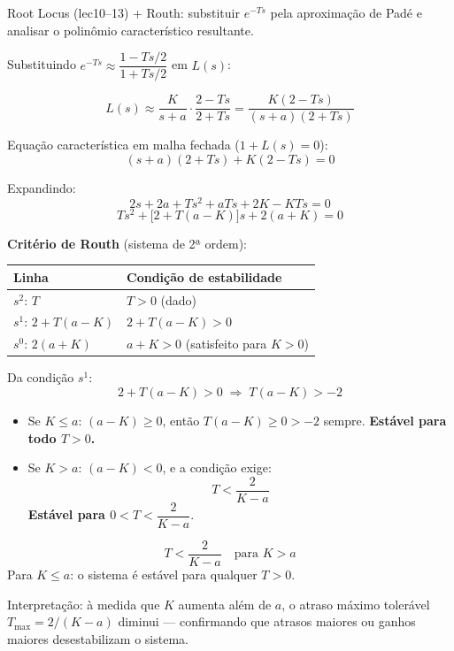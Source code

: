 \documentclass[12pt,a4paper]{article}
\begin{document}
\begin{metodo}
  Root Locus (lec10--13) + Routh: substituir $e^{-Ts}$ pela aproximação de
  Padé e analisar o polinômio característico resultante.
\end{metodo}

Substituindo $e^{-Ts} \approx \dfrac{1 - Ts/2}{1 + Ts/2}$ em $L(s)$:

\[
  L(s) \approx \frac{K}{s + a} \cdot \frac{2 - Ts}{2 + Ts}
  = \frac{K(2 - Ts)}{(s + a)(2 + Ts)}
\]

Equação característica em malha fechada ($1 + L(s) = 0$):
\[
  (s + a)(2 + Ts) + K(2 - Ts) = 0
\]

Expandindo:
\[
  2s + 2a + Ts^2 + aTs + 2K - KTs = 0
\]
\[
  Ts^2 + \bigl[2 + T(a - K)\bigr]s + 2(a + K) = 0
\]

\textbf{Critério de Routh} (sistema de 2ª ordem):
\begin{center}
\begin{tabular}{ll}
\toprule
Linha & Condição de estabilidade \\
\midrule
$s^2$: $T$ & $T > 0$ \hfill (dado) \\
$s^1$: $2 + T(a - K)$ & $2 + T(a - K) > 0$ \\
$s^0$: $2(a + K)$ & $a + K > 0$ \hfill (satisfeito para $K > 0$) \\
\bottomrule
\end{tabular}
\end{center}

Da condição $s^1$:
\[
  2 + T(a - K) > 0
  \;\Rightarrow\;
  T(a - K) > -2
\]

\begin{itemize}
  \item Se $K \leq a$: $(a - K) \geq 0$, então $T(a-K) \geq 0 > -2$ sempre.
        \textbf{Estável para todo $T > 0$.}
  \item Se $K > a$: $(a - K) < 0$, e a condição exige:
        \[
          T < \frac{2}{K - a}
        \]
        \textbf{Estável para $0 < T < \dfrac{2}{K - a}$}.
\end{itemize}

\begin{resposta}
\[
  \boxed{T < \frac{2}{K - a} \quad \text{para } K > a}
\]
Para $K \leq a$: o sistema é estável para qualquer $T > 0$.

Interpretação: à medida que $K$ aumenta além de $a$, o atraso máximo
tolerável $T_{\max} = 2/(K-a)$ diminui — confirmando que atrasos maiores ou
ganhos maiores desestabilizam o sistema.
\end{resposta}
\end{document}
